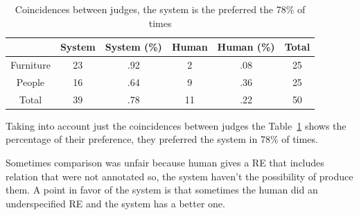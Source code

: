 \begin{table}[h!]
\begin{center}
\begin{tabular}{|c|c|c|c|c|c|}
\hline
           & System & System (\%) & Human & Human (\%) & Total\\
\hline
Furniture & 23  & .92 &  2 & .08  & 25 \\
People    & 16  & .64 & 9  & .36 & 25 \\
\hline
Total     & 39  & .78    & 11 & .22 & 50  \\
\hline
\end{tabular}
\caption{Coincidences between judges, the system is the preferred the 78\% of times} 
\label{system-better}
\end{center}
\end{table}
Taking into account just the coincidences between judges the Table~\ref{system-better} shows the percentage of their preference, they preferred the system in 78\% of times.

Sometimes comparison was unfair because human gives a RE that includes relation that were not annotated so, the system haven't the possibility of produce them. A point in favor of the system is that sometimes the human did an underspecified RE and the system has a better one.\\

